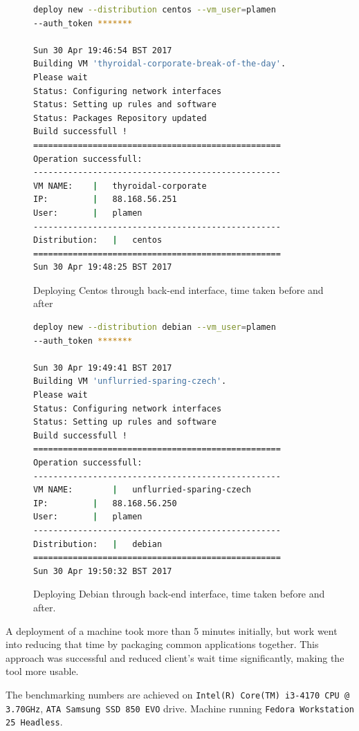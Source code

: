 \documentclass{article}
\begin{document}
\begin{figure}
\begin{lstlisting}[frame=single, language=Bash]
deploy new --distribution centos --vm_user=plamen
--auth_token *******

Sun 30 Apr 19:46:54 BST 2017
Building VM 'thyroidal-corporate-break-of-the-day'.
Please wait
Status: Configuring network interfaces
Status: Setting up rules and software
Status: Packages Repository updated
Build successfull !
==================================================
Operation successfull:
--------------------------------------------------
VM NAME:    |	thyroidal-corporate
IP:			|	88.168.56.251
User:		|	plamen
--------------------------------------------------
Distribution:	|	centos
==================================================
Sun 30 Apr 19:48:25 BST 2017

\end{lstlisting}
\caption{Deploying Centos through back-end interface, time taken before and after}
\label{fig:deeploy-centos-output}
\end{figure}

\begin{figure}
\begin{lstlisting}[frame=single, language=Bash]
deploy new --distribution debian --vm_user=plamen
--auth_token *******

Sun 30 Apr 19:49:41 BST 2017
Building VM 'unflurried-sparing-czech'.
Please wait
Status: Configuring network interfaces
Status: Setting up rules and software
Build successfull !
==================================================
Operation successfull:
--------------------------------------------------
VM NAME:		|	unflurried-sparing-czech
IP:			|	88.168.56.250
User:		|	plamen
--------------------------------------------------
Distribution:	|	debian
==================================================
Sun 30 Apr 19:50:32 BST 2017
\end{lstlisting}
\caption{Deploying Debian through back-end interface, time taken before and after.}
\label{fig:deeploy-debian-output}
\end{figure}

A deployment of a machine took more than 5 minutes initially, but work went into reducing that time by packaging common applications together. This approach was successful and reduced client's wait time significantly, making the tool more usable.

The benchmarking numbers are achieved on \texttt{Intel(R) Core(TM) i3-4170 CPU @ 3.70GHz}, \texttt{ATA Samsung SSD 850 EVO} drive. Machine running \texttt{Fedora Workstation 25 Headless}.
\end{document}
